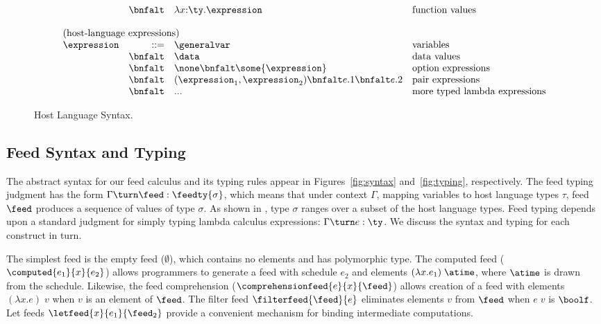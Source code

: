 \begin{figure}[t]
\[\begin{array}{lrll}
& \bnfalt & \lambda x{:}\ty.\expression & \mbox{function values} \\
\\
\multicolumn{4}{l}{\mbox{(host-language expressions)}}\\ 
\expression & ::= & \generalvar & \mbox{variables} \\
 & \bnfalt & \data & \mbox{data values} \\
 & \bnfalt & \none \bnfalt 
              \some{\expression} & \mbox{option expressions}\\
 & \bnfalt & (\expression_1,\expression_2) \bnfalt e.1 \bnfalt e.2 
    & \mbox{pair expressions} \\
 & \bnfalt & ... & \mbox{more typed lambda expressions} \\
\end{array}
\]
\caption{Host Language Syntax.}
\label{fig:host-language}
\end{figure}


\subsection{Feed Syntax and Typing}

The abstract syntax for our feed calculus and its typing rules appear
in Figures~\ref{fig:syntax} and~\ref{fig:typing}, respectively.  The
feed typing judgment has the form 
$\Gamma \turn \feed : \feedty{\sigma}$, 
which means that under context 
$\Gamma$, mapping variables to host language types $\tau$, feed
$\feed$ produces a sequence of values of type $\sigma$.  As shown in
, type $\sigma$ ranges over a subset of the
host language types.  Feed typing depends upon a standard judgment for
simply typing lambda calculus expressions:  $\Gamma \turn e : \ty$.
We discuss the syntax and typing for each construct in turn.

The simplest feed is the empty feed ($\emptyset$), which contains no
elements and has polymorphic type. 
The computed feed ($\computed{e_1}{x}{e_2}$) allows programmers to
generate a feed with schedule $e_2$ and elements $(\lambda x.e_1)\; \atime$,
where $\atime$ is drawn from the schedule. Likewise, the feed 
comprehension ($\comprehensionfeed{e}{x}{\feed}$) allows creation of a 
feed with elements $(\lambda x.e)\; v$ when $v$ is an element of $\feed$.
The filter feed
$\filterfeed{\feed}{e}$ eliminates elements $v$ from $\feed$ when
$e\; v$ is $\boolf$.  Let feeds $\letfeed{x}{e_1}{\feed_2}$
provide a convenient mechanism for binding intermediate computations.

